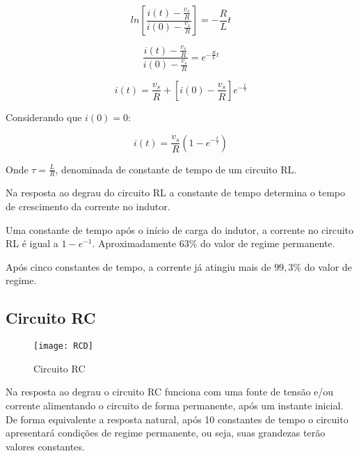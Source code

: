 \documentclass[12pt,fleqn]{book} %
\begin{document}
{\begin{equation}
ln[\frac{i(t)-\frac{v_s}{R}}{i(0)-\frac{v_s}{R}}] = -\frac{R}{L}t 
\end{equation}

\begin{equation}
\frac{i(t)-\frac{v_s}{R}}{i(0)-\frac{v_s}{R}} = e^{-\frac{R}{L}t}
\end{equation}

\begin{equation}
i(t) = \frac{v_s}{R} + [i(0)-\frac{v_s}{R}]e^{-\frac{t}{\tau}}
\end{equation}

Considerando que $i(0) = 0$:

\begin{equation}
i(t) = \frac{v_s}{R}(1-e^{-\frac{t}{\tau}})
\end{equation}

Onde $\tau=\frac{L}{R}$, denominada de constante de tempo de um circuito RL.

\begin{remark}
Na resposta ao degrau do circuito RL a constante de tempo determina o tempo de crescimento da corrente no indutor.
\end{remark}

\begin{remark}
Uma constante de tempo após o início de carga do indutor, a corrente no circuito RL é igual a $1-e^{-1}$. Aproximadamente $63\%$ do valor de regime permanente.
\end{remark}

\begin{remark}
Após cinco constantes de tempo, a corrente já atingiu mais de $99,3\%$ do valor de regime.
\end{remark}
        
        \subsection{Circuito RC}
        
                \begin{figure}[!htbp] \centering\texttt{[image: RCD]}
            \caption{Circuito RC}\label{RCD} 
        \end{figure}
        
Na resposta ao degrau o circuito RC funciona com uma fonte de tensão e/ou corrente alimentando o circuito de forma permanente, após um instante inicial. De forma equivalente a resposta natural, após 10 constantes de tempo o circuito apresentará condições de regime permanente, ou seja, suas grandezas terão valores constantes.

}
\end{document}
